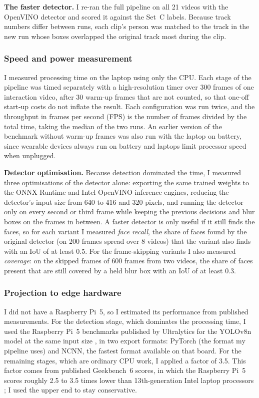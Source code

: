 \textbf{The faster detector.} I re-ran the full pipeline on all 21 videos with the OpenVINO
detector and scored it against the Set~C labels. Because track numbers differ between
runs, each clip's person was matched to the track in the new run whose boxes overlapped
the original track most during the clip.

\subsubsection{Speed and power measurement}

I measured processing time on the laptop using only the CPU. Each stage of the pipeline
was timed separately with a high-resolution timer over 300 frames of one interaction video,
after 30 warm-up frames that are not counted, so that one-off start-up costs do not inflate
the result. Each configuration was run twice, and the throughput in frames per second (FPS)
is the number of frames divided by the total time, taking the median of the two runs. An
earlier version of the benchmark without warm-up frames was also run with the laptop on
battery, since wearable devices always run on battery and laptops limit processor speed when
unplugged.

\textbf{Detector optimisation.} Because detection dominated the time, I measured three
optimisations of the detector alone: exporting the same trained weights to the ONNX Runtime
and Intel OpenVINO inference engines, reducing the detector's input size from 640 to 416
and 320 pixels, and running the detector only on every second or third frame while keeping
the previous decisions and blur boxes on the frames in between. A faster detector is only
useful if it still finds the faces, so for each variant I measured \emph{face recall}, the
share of faces found by the original detector (on 200 frames spread over 8 videos) that the
variant also finds with an IoU of at least 0.5. For the frame-skipping variants I also
measured \emph{coverage}: on the skipped frames of 600 frames from two videos, the share of
faces present that are still covered by a held blur box with an IoU of at least 0.3.

\subsubsection{Projection to edge hardware}

I did not have a Raspberry Pi~5, so I estimated its performance from published
measurements. For the detection stage, which dominates the processing time, I used the
Raspberry Pi~5 benchmarks published by Ultralytics for the YOLOv8n model at the same
input size \cite{ultralytics_rpi}, in two export formats: PyTorch (the format my pipeline
uses) and NCNN, the fastest format available on that board. For the remaining stages,
which are ordinary CPU work, I applied a factor of 3.5. This factor comes from published
Geekbench~6 scores, in which the Raspberry Pi~5 scores roughly 2.5 to 3.5 times lower
than 13th-generation Intel laptop processors \cite{geekbench_pi5}; I used the upper end to
stay conservative.
